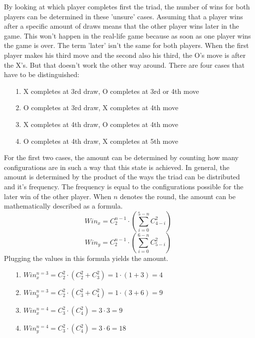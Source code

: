 \documentclass[12pt]{article}
\begin{document}
By looking at which player completes first the triad, the number of wins for both players can be determined in these 'unsure' cases. Assuming that a player wins after a specific amount of draws means that the other player wins later in the game. This won't happen in the real-life game because as soon as one player wins the game is over. The term 'later' isn't the same for both players. When the first player makes his third move and the second also his third, the O's move is after the X's. But that doesn't work the other way around. There are four cases that have to be distinguished:
\begin{itemize}
    \item [1.]{X completes at 3rd draw, O completes at 3rd or 4th move}
    \item [2.]{O completes at 3rd draw, X completes at 4th move}
    \item [3.]{X completes at 4th draw, O completes at 4th move}
    \item [4.]{O completes at 4th draw, X completes at 5th move}
\end{itemize}
For the first two cases, the amount can be determined by counting how many configurations are in such a way that this \gls{state} is achieved. In general, the amount is determined by the product of the ways the triad can be distributed and it's frequency. The frequency is equal to the configurations possible for the later win of the other player. When $n$ denotes the round, the amount can be mathematically described as a formula.
\begin{equation}\nonumber
   Win_{x} = C_{2}^{n-1} \cdot \left ( \sum _{i = 0}^{5 - n} C_{4-i}^{2} \right )
 \end{equation}
 \begin{equation}\nonumber
      Win_{y} = C_{2}^{n-1} \cdot \left ( \sum _{i = 0}^{6 - n} C_{5-i}^{2} \right )
\end{equation}
Plugging the values in this formula yields the amount.
\begin{itemize}
    \item [1.]{$ Win_{x}^{n=3} = C_{2}^{2} \cdot \left ( C_{2}^{2} + C_{3}^{2}  \right ) = 1 \cdot (1+3) = 4$}
    \item [2.]{ $Win_{y}^{n=3} = C_{2}^{2} \cdot \left ( C_{3}^{2} + C_{4}^{2}  \right ) = 1 \cdot (3+6) = 9$}
    \item [3.]{$   Win_{x}^{n=4} = C_{3}^{2} \cdot \left ( C_{4}^{2} \right ) = 3 \cdot 3 = 9$}
    \item [4.]{$   Win_{y}^{n=4} = C_{3}^{2} \cdot \left ( C_{4}^{2} \right ) = 3 \cdot 6 = 18$}
\end{itemize}
\end{document}
